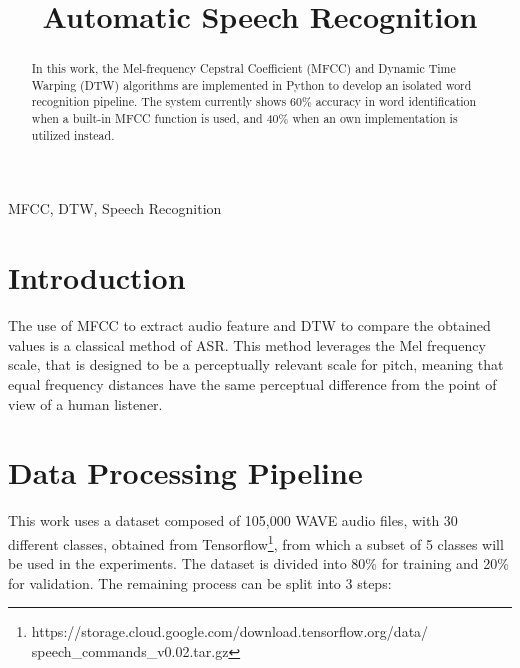 \documentclass[conference]{IEEEtran}
\begin{document}
\begin{acronym}
\end{acronym}

\title{Automatic Speech Recognition\\}
\author{
}

\maketitle

\begin{abstract}
In this work, the Mel-frequency Cepstral Coefficient (MFCC) and 
Dynamic Time Warping (DTW) algorithms are implemented in 
Python to develop an isolated word recognition pipeline.
The system currently shows 60\% accuracy in word identification when 
a built-in MFCC function is used, and 40\% when an
own implementation is utilized instead.
\end{abstract}

\begin{IEEEkeywords}
MFCC, DTW, Speech Recognition 
\end{IEEEkeywords}

\section{Introduction}
The use of \ac{MFCC} to extract audio feature and \ac{DTW} to compare the obtained
values is a classical method of \ac{ASR}. This method leverages the Mel frequency 
scale, that is designed to be a perceptually relevant scale for pitch, meaning 
that equal frequency distances have the same perceptual difference from the point 
of view of a human listener. 

\section{Data Processing Pipeline}
This work uses a dataset composed of 105,000 WAVE audio files, with 30 different 
classes, obtained from Tensorflow\footnote{https://storage.cloud.google.com/download.tensorflow.org/data/\\
speech\_commands\_v0.02.tar.gz}, from which a subset of 5 classes will be used in 
the experiments. The dataset is divided into 80\% for training and 20\% for 
validation. The remaining process can be split into 3 steps:
\end{document}
